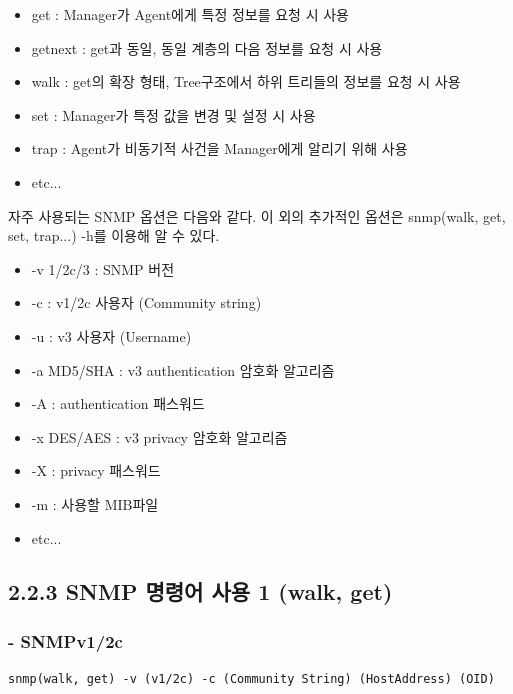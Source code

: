 \documentclass[11pt
  , a4paper
  , article
  , oneside
]{memoir}
\begin{document}
\begin{itemize}
\item get : Manager가 Agent에게 특정 정보를 요청 시 사용
\item getnext : get과 동일, 동일 계층의 다음 정보를 요청 시 사용
\item walk : get의 확장 형태, Tree구조에서 하위 트리들의 정보를 요청 시 사용
\item set : Manager가 특정 값을 변경 및 설정 시 사용
\item trap : Agent가 비동기적 사건을 Manager에게 알리기 위해 사용
\item etc...
\end{itemize}

\clearpage

자주 사용되는 SNMP 옵션은 다음와 같다. 이 외의 추가적인 옵션은 snmp(walk, get, set, trap...) -h를 이용해 알 수 있다.

\begin{itemize}
\item -v 1/2c/3 : SNMP 버전
\item -c : v1/2c 사용자 (Community string)
\item -u : v3 사용자 (Username)
\item -a MD5/SHA : v3 authentication 암호화 알고리즘
\item -A : authentication 패스워드
\item -x DES/AES : v3 privacy 암호화 알고리즘
\item -X : privacy 패스워드
\item -m : 사용할 MIB파일
\item etc...
\end{itemize}


\subsection{2.2.3 SNMP 명령어 사용 1 (walk, get)}
\subsubsection{- SNMPv1/2c}

\begin{lstlisting}[style=termstyle]
snmp(walk, get) -v (v1/2c) -c (Community String) (HostAddress) (OID) 
\end{lstlisting}
\end{document}
